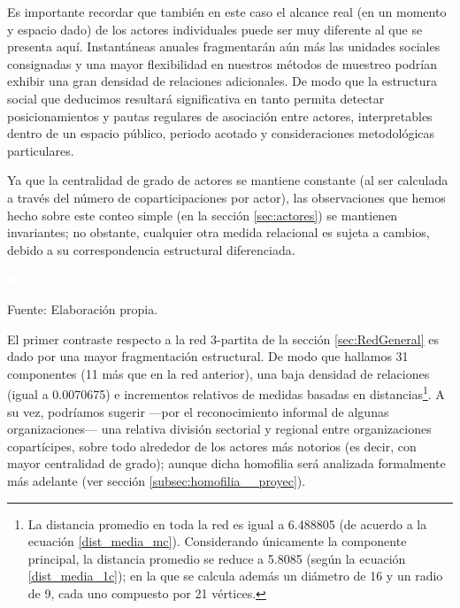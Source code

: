 \documentclass[letterpaper, 11pt]{book}
\theoremstyle{definition}
\theoremstyle{remark}
\begin{document}
Es importante recordar que también en este caso el alcance real (en un momento y espacio dado) de los actores individuales puede ser muy diferente al que se presenta aquí. 
Instantáneas anuales fragmentarán aún más las unidades sociales consignadas y una mayor flexibilidad en nuestros métodos de muestreo podrían exhibir una gran densidad de relaciones adicionales. 
De modo que la estructura social que deducimos resultará significativa en tanto permita detectar posicionamientos y pautas regulares de asociación entre actores, interpretables dentro de un espacio público, periodo acotado y consideraciones metodológicas particulares. 


Ya que la centralidad de grado de actores se mantiene constante (al ser calculada a través del número de coparticipaciones por actor), las observaciones que hemos hecho sobre este conteo simple (en la sección \ref{sec:actores}) se mantienen invariantes; no obstante, cualquier otra medida relacional es sujeta a cambios, debido a su correspondencia estructural diferenciada. 



\pagebreak
\hspace{-1.5em} \begin{minipage}{\linewidth}
\centering\bigskip
{} \label{5_1_red_actores_eventos}

\includegraphics[scale=0.1]{img/null.png}
\vspace{39em}
\par\bigskip
\small Fuente: Elaboración propia.
\end{minipage}\bigskip

El primer contraste respecto a la red 3-partita de la sección \ref{sec:RedGeneral} es dado por una mayor fragmentación estructural. 
De modo que hallamos 31 componentes (11 más que en la red anterior), una baja densidad de relaciones (igual a 0.0070675) e incrementos relativos de medidas basadas en distancias\footnote{
    La distancia promedio en toda la red es igual a 6.488805 (de acuerdo a la ecuación \ref{dist_media_mc}). 
    Considerando únicamente la componente principal, la distancia promedio se reduce a 5.8085 (según la ecuación \ref{dist_media_1c}); en la que se calcula además un diámetro de 16 y un radio de 9, cada uno compuesto por 21 vértices. 
}. 
A su vez, podríamos sugerir ---por el reconocimiento informal de algunas organizaciones--- una relativa división sectorial y regional entre organizaciones copartícipes, sobre todo alrededor de los actores más notorios (es decir, con mayor centralidad de grado); aunque dicha homofilia será analizada formalmente más adelante (ver sección \ref{subsec:homofilia__proyec}). 
\end{document}
